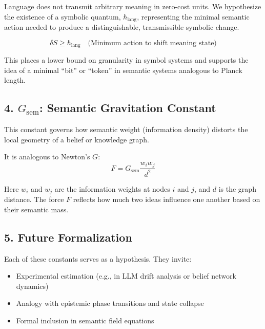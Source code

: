 Language does not transmit arbitrary meaning in zero-cost units. We hypothesize the existence of a symbolic quantum, $\hbar_{\text{lang}}$, representing the minimal semantic action needed to produce a distinguishable, transmissible symbolic change.

\[
\delta S \geq \hbar_{\text{lang}} \quad \text{(Minimum action to shift meaning state)}
\]

This places a lower bound on granularity in symbol systems and supports the idea of a minimal “bit” or “token” in semantic systems analogous to Planck length.

\subsection*{4. $G_{\text{sem}}$: Semantic Gravitation Constant}

This constant governs how semantic weight (information density) distorts the local geometry of a belief or knowledge graph.

It is analogous to Newton’s $G$:
\[
F = G_{\text{sem}} \frac{w_i w_j}{d^2}
\]

Here $w_i$ and $w_j$ are the information weights at nodes $i$ and $j$, and $d$ is the graph distance. The force $F$ reflects how much two ideas influence one another based on their semantic mass.

\subsection*{5. Future Formalization}

Each of these constants serves as a hypothesis. They invite:
\begin{itemize}
  \item Experimental estimation (e.g., in LLM drift analysis or belief network dynamics)
  \item Analogy with epistemic phase transitions and state collapse
  \item Formal inclusion in semantic field equations
\end{itemize}

